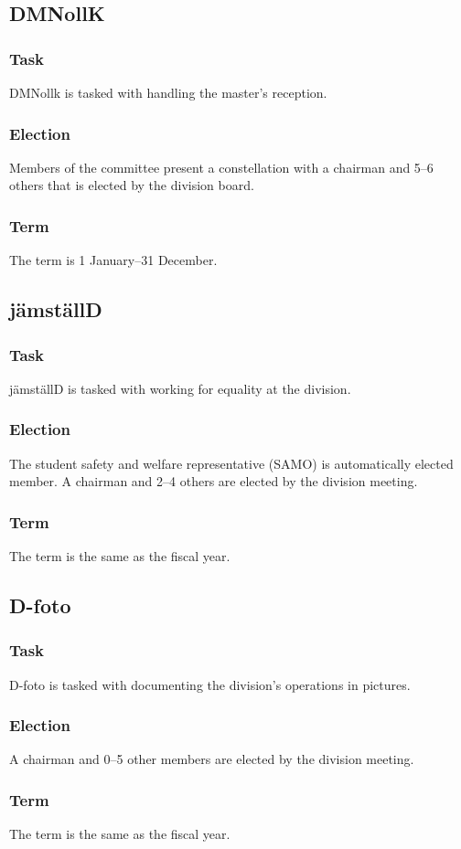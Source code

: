 \subsection{DMNollK}
\subsubsection{Task}
DMNollk is tasked with handling the master's reception. 
\subsubsection{Election}
Members of the committee present a constellation with a chairman and 5--6 others that is elected by the division board. 
\subsubsection{Term}
The term is 1 January--31 December.

\subsection{jämställD}
\subsubsection{Task}
jämställD is tasked with working for equality at the division.
\subsubsection{Election}
The student safety and welfare representative (SAMO) is automatically elected member. A chairman and 2--4 others are elected by the division meeting.
\subsubsection{Term}
The term is the same as the fiscal year.

\subsection{D-foto}
\subsubsection{Task}
D-foto is tasked with documenting the division's operations in pictures.
\subsubsection{Election}
A chairman and 0--5 other members are elected by the division meeting.
\subsubsection{Term}
The term is the same as the fiscal year. 

\newpage
